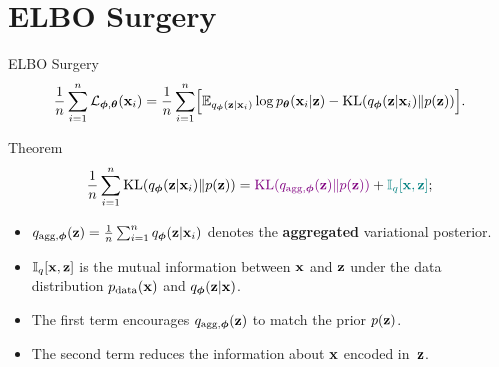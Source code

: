 \documentclass{beamer}
\renewcommand{\eqpause}{}
\begin{document}
\section{ELBO Surgery}
\begin{frame}{ELBO Surgery}
	\vspace{-0.3cm}
	\[
	    \frac{1}{n} \sum_{i=1}^n \mathcal{L}_{\boldsymbol{\phi}, \boldsymbol{\theta}}(\mathbf{x}_i) = \frac{1}{n} \sum_{i=1}^n \Bigl[ \mathbb{E}_{q_{\boldsymbol{\phi}}(\mathbf{z}| \mathbf{x}_i)} \log p_{\boldsymbol{\theta}}(\mathbf{x}_i | \mathbf{z}) - \mathrm{KL}(q_{\boldsymbol{\phi}}(\mathbf{z}| \mathbf{x}_i) \| p(\mathbf{z})) \Bigr].
	\]
    \eqpause
	\vspace{-0.3cm}
	\begin{block}{Theorem}
		\vspace{-0.5cm}
		\[
		    \frac{1}{n} \sum_{i=1}^n \mathrm{KL}(q_{\boldsymbol{\phi}}(\mathbf{z}| \mathbf{x}_i) \| p(\mathbf{z})) = {\color{violet} \mathrm{KL}(q_{\text{agg}, \boldsymbol{\phi}}(\mathbf{z}) \| p(\mathbf{z}))} + {\color{teal}\mathbb{I}_{q} [\mathbf{x}, \mathbf{z}]};
		\]
        \eqpause
		\vspace{-0.5cm}
		\begin{itemize}
			\item $q_{\text{agg}, \boldsymbol{\phi}}(\mathbf{z}) = \frac{1}{n} \sum_{i=1}^n q_{\boldsymbol{\phi}}(\mathbf{z}| \mathbf{x}_i)$ denotes the \textbf{aggregated} variational posterior.
			\item $\mathbb{I}_{q} [\mathbf{x}, \mathbf{z}]$ is the mutual information between $\mathbf{x}$ and $\mathbf{z}$ under the data distribution $p_{\text{data}}(\mathbf{x})$ and $q_{\boldsymbol{\phi}}(\mathbf{z}| \mathbf{x})$.
			\item  {\color{violet} The first term} encourages $q_{\text{agg}, \boldsymbol{\phi}}(\mathbf{z})$ to match the prior $p(\mathbf{z})$.
			\item {\color{teal} The second term} reduces the information about $\mathbf{x}$ encoded in~$\mathbf{z}$.
		\end{itemize}
	\end{block}
\end{frame}
\end{document}
